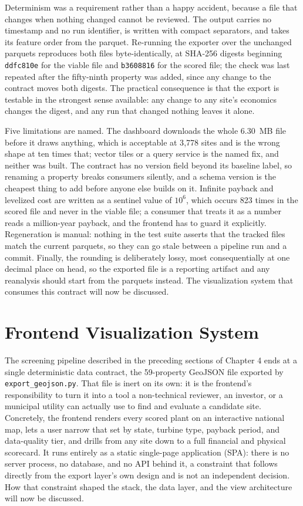 \documentclass[12pt,letterpaper]{report}
\begin{document}
Determinism was a requirement rather than a happy accident, because a file that
changes when nothing changed cannot be reviewed. The output carries no timestamp
and no run identifier, is written with compact separators, and takes its feature
order from the parquet. Re-running the exporter over the unchanged parquets
reproduces both files byte-identically, at SHA-256 digests beginning
\texttt{ddfc810e} for the viable file and \texttt{b3608816} for the scored file;
the check was last repeated after the fifty-ninth property was added, since any
change to the contract moves both digests.
The practical consequence is that the export is testable in the strongest sense
available: any change to any site's economics changes the digest, and any run that
changed nothing leaves it alone.

Five limitations are named. The dashboard downloads the whole 6.30~MB file before
it draws anything, which is acceptable at 3{,}778 sites and is the wrong shape at
ten times that; vector tiles or a query service is the named fix, and neither was
built. The contract has no version field beyond its baseline label, so renaming a
property breaks consumers silently, and a schema version is the cheapest thing to
add before anyone else builds on it. Infinite payback and levelized cost are
written as a sentinel value of $10^6$, which occurs 823 times in the scored file
and never in the viable file; a consumer that treats it as a number reads a
million-year payback, and the frontend has to guard it explicitly. Regeneration is
manual: nothing in the test suite asserts that the tracked files match the
current parquets, so they can go stale between a pipeline run and a commit.
Finally, the rounding is deliberately lossy, most consequentially at one decimal
place on head, so the exported file is a reporting artifact and any reanalysis
should start from the parquets instead. The visualization system that consumes
this contract will now be discussed.

\section{Frontend Visualization System}                  %

The screening pipeline described in the preceding sections of Chapter 4 ends
at a single deterministic data contract, the 59-property GeoJSON file
exported by \texttt{export\_geojson.py}. That file is inert on its own: it
is the frontend's responsibility to turn it into a tool a non-technical
reviewer, an investor, or a municipal utility can actually use to find and
evaluate a candidate site. Concretely, the frontend renders every scored
plant on an interactive national map, lets a user narrow that set by state,
turbine type, payback period, and data-quality tier, and drills from any
site down to a full financial and physical scorecard. It runs entirely as a
static single-page application (SPA): there is no server process, no
database, and no API behind it, a constraint that follows directly from the
export layer's own design and is not an independent decision. How that
constraint shaped the stack, the data layer, and the view architecture will
now be discussed.
\end{document}
